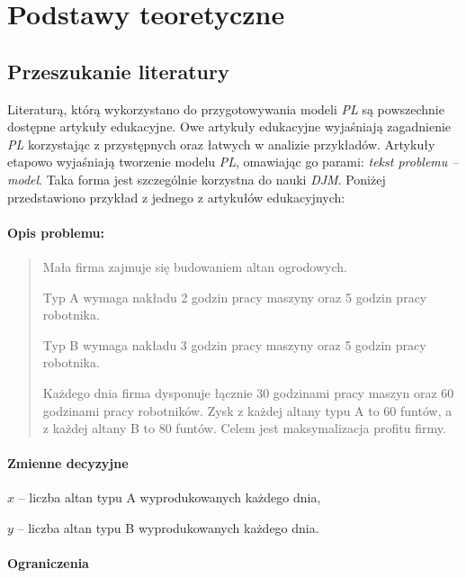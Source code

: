 
\chapter{Podstawy teoretyczne}\label{ch:review}

\section{Przeszukanie literatury}

Literaturą, którą wykorzystano do przygotowywania modeli \textit{PL} są powszechnie dostępne artykuły edukacyjne. Owe artykuły edukacyjne wyjaśniają zagadnienie \textit{PL} korzystając z przystępnych oraz łatwych w analizie przykładów. Artykuły etapowo wyjaśniają tworzenie modelu \textit{PL}, omawiając go parami: \textit{tekst problemu -- model}. Taka forma jest szczególnie korzystna do nauki \textit{DJM}. Poniżej przedstawiono przykład z jednego z artykułów edukacyjnych\cite{cimt}:

\subsubsection*{Opis problemu:} \label{sec:model_example}
\begin{quote}
Mała firma zajmuje się budowaniem altan ogrodowych.

Typ A wymaga nakładu 2 godzin pracy maszyny oraz 5 godzin pracy robotnika.  

Typ B wymaga nakładu 3 godzin pracy maszyny oraz 5 godzin pracy robotnika. 

Każdego dnia firma dysponuje łącznie 30 godzinami pracy maszyn oraz 60 godzinami pracy robotników. Zysk z każdej altany typu A to 60 funtów, a z każdej altany B to 80 funtów. Celem jest maksymalizacja profitu firmy.

\end{quote}

\subsubsection*{Zmienne decyzyjne}

$x$ – liczba altan typu A wyprodukowanych każdego dnia,

$y$ – liczba altan typu B wyprodukowanych każdego dnia.

\subsubsection*{Ograniczenia}

